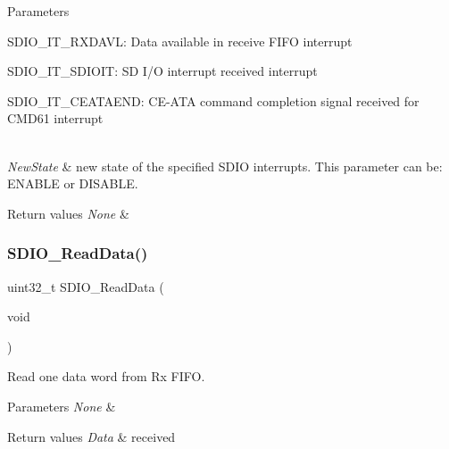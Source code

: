 \begin{DoxyParams}{Parameters}
\begin{DoxyItemize}
S\+D\+I\+O\+\_\+\+I\+T\+\_\+\+R\+X\+D\+A\+VL\+: Data available in receive F\+I\+FO interrupt \item S\+D\+I\+O\+\_\+\+I\+T\+\_\+\+S\+D\+I\+O\+IT\+: SD I/O interrupt received interrupt \item S\+D\+I\+O\+\_\+\+I\+T\+\_\+\+C\+E\+A\+T\+A\+E\+ND\+: C\+E-\/\+A\+TA command completion signal received for C\+M\+D61 interrupt \end{DoxyItemize}
\\
\hline
{\em New\+State} & new state of the specified S\+D\+IO interrupts. This parameter can be\+: E\+N\+A\+B\+LE or D\+I\+S\+A\+B\+LE. \\
\hline
\end{DoxyParams}

\begin{DoxyRetVals}{Return values}
{\em None} & \\
\hline
\end{DoxyRetVals}
\mbox{\label{group___s_d_i_o___exported___functions_ga4e8ac755ef3c31ecd4ed2708df19187e}} 
\subsubsection{\texorpdfstring{SDIO\_ReadData()}{SDIO\_ReadData()}}
{\footnotesize\ttfamily uint32\+\_\+t S\+D\+I\+O\+\_\+\+Read\+Data (\begin{DoxyParamCaption}\item[{void}]{ }\end{DoxyParamCaption})}



Read one data word from Rx F\+I\+FO. 


\begin{DoxyParams}{Parameters}
{\em None} & \\
\hline
\end{DoxyParams}

\begin{DoxyRetVals}{Return values}
{\em Data} & received \\
\hline
\end{DoxyRetVals}
\mbox{\label{group___s_d_i_o___exported___functions_ga8dc7f17804bdb745b42f6647c8487b4c}} 
